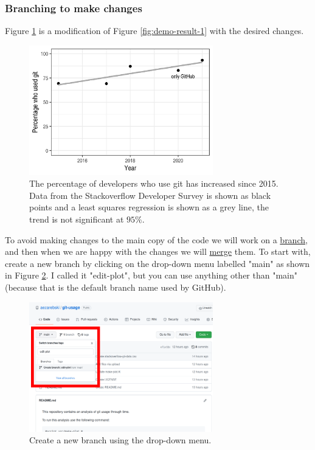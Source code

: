 \documentclass[11pt,onecolumn]{scrartcl}
\begin{document}
\subsubsection*{Branching to make changes}
\label{sec:org74b4d61}

Figure \ref{fig:demo-result-2} is a modification of Figure \ref{fig:demo-result-1} with the
desired changes.

\begin{figure}[htbp]
\centering
\includegraphics[width=8cm]{./git-usage-2.png}
\caption{\label{fig:demo-result-2}The percentage of developers who use git has increased since 2015. Data from the Stackoverflow Developer Survey is shown as black points and a least squares regression is shown as a grey line, the trend is not significant at \(95\%\).}
\end{figure}

To avoid making changes to the main copy of the code we will work on a \hyperref[sec:org43a575d]{branch},
and then when we are happy with the changes we will \hyperref[sec:org8f2ea49]{merge} them. To start with,
create a new branch by clicking on the drop-down menu labelled "main" as shown
in Figure \ref{fig:create-new-branch}. I called it "edit-plot", but you can use
anything other than "main" (because that is the default branch name used by
GitHub).

\begin{figure}[htbp]
\centering
\includegraphics[width=8cm]{./create-new-branch.png}
\caption{\label{fig:create-new-branch}Create a new branch using the drop-down menu.}
\end{figure}
\end{document}
